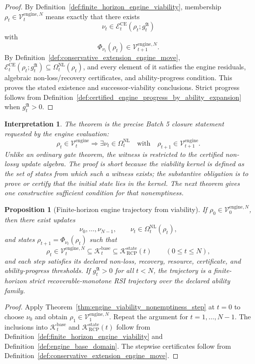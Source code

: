 \documentclass[11pt]{article}
\newtheorem{proposition}[theorem]{Proposition}
\newtheorem{interpretation}[theorem]{Interpretation}
\newcommand{\K}{\mathcal{K}}
\newcommand{\Ecal}{\mathcal{E}}
\newcommand{\1}{\mathbf{1}}
\newcommand{\RCP}{\mathrm{RCP}}
\newcommand{\state}{\mathrm{state}}
\providecommand{\Kcal}{\mathcal{K}}
\providecommand{\Vcal}{\mathcal{V}}
\begin{document}
\begin{proof}
By Definition~\ref{def:finite_horizon_engine_viability}, membership \(\rho_t\in\Vcal_t^{\mathrm{engine},N}\) means exactly that there exists
\[
\nu_t\in\Ecal_t^{\mathrm{CE}}(\rho_t;g_t^{\mathfrak A})
\]
with
\[
\Phi_{\nu_t}(\rho_t)\in\Vcal_{t+1}^{\mathrm{engine},N}.
\]
By Definition~\ref{def:conservative_extension_engine_move}, \(\Ecal_t^{\mathrm{CE}}(\rho_t;g_t^{\mathfrak A})\subseteq\Omega_t^{\mathrm{NL}}(\rho_t)\), and every element of it satisfies the engine residuals, algebraic non-loss/recovery certificates, and ability-progress condition.  This proves the stated existence and successor-viability conclusions.  Strict progress follows from Definition~\ref{def:certified_engine_progress_by_ability_expansion} when \(g_t^{\mathfrak A}>0\).
\end{proof}

\begin{interpretation}
The theorem is the precise Batch 5 closure statement requested by the engine evaluation:
\[
\rho_t\in\Vcal_t^{\mathrm{engine}}
\Longrightarrow
\exists\nu_t\in\Omega_t^{\mathrm{NL}}
\quad\text{with}\quad
\rho_{t+1}\in\Vcal_{t+1}^{\mathrm{engine}}.
\]
Unlike an ordinary gate theorem, the witness is restricted to the certified non-lossy update algebra.  The proof is short because the viability kernel is defined as the set of states from which such a witness exists; the substantive obligation is to prove or certify that the initial state lies in the kernel.  The next theorem gives one constructive sufficient condition for that nonemptiness.
\end{interpretation}

\begin{proposition}[Finite-horizon engine trajectory from viability]
\label{prop:finite_horizon_engine_trajectory_from_viability}
If \(\rho_0\in\Vcal_0^{\mathrm{engine},N}\), then there exist updates
\[
\nu_0,\ldots,\nu_{N-1},
\qquad
\nu_t\in\Omega_t^{\mathrm{NL}}(\rho_t),
\]
and states \(\rho_{t+1}=\Phi_{\nu_t}(\rho_t)\) such that
\[
\rho_t\in\Vcal_t^{\mathrm{engine},N}
\subseteq\Kcal_t^{\mathrm{base}}
\subseteq\K_{\RCP}^{\state}(t)
\qquad(0\le t\le N),
\]
and each step satisfies its declared non-loss, recovery, resource, certificate, and ability-progress thresholds.  If \(g_t^{\mathfrak A}>0\) for all \(t<N\), the trajectory is a finite-horizon strict recoverable-monotone RSI trajectory over the declared ability family.
\end{proposition}

\begin{proof}
Apply Theorem~\ref{thm:engine_viability_nonemptiness_step} at \(t=0\) to choose \(\nu_0\) and obtain \(\rho_1\in\Vcal_1^{\mathrm{engine},N}\).  Repeat the argument for \(t=1,\ldots,N-1\).  The inclusions into \(\Kcal_t^{\mathrm{base}}\) and \(\K_{\RCP}^{\state}(t)\) follow from Definition~\ref{def:finite_horizon_engine_viability} and Definition~\ref{def:engine_base_domain}.  The stepwise certificates follow from Definition~\ref{def:conservative_extension_engine_move}.
\end{proof}
\end{document}
